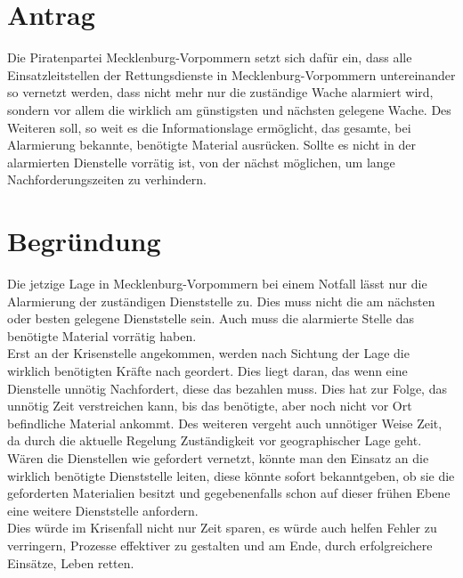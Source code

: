 \section{Antrag}

Die Piratenpartei Mecklenburg-Vorpommern setzt sich dafür ein, dass alle Einsatzleitstellen der Rettungsdienste in Mecklenburg-Vorpommern untereinander so vernetzt werden, dass nicht mehr nur die zuständige Wache alarmiert wird, sondern vor allem die wirklich am günstigsten und nächsten gelegene Wache. Des Weiteren soll, so weit es die Informationslage ermöglicht, das gesamte, bei Alarmierung bekannte, benötigte Material ausrücken. Sollte es nicht in der alarmierten Dienstelle vorrätig ist, von der nächst möglichen, um lange Nachforderungszeiten zu verhindern.

\section{Begründung}

Die jetzige Lage in Mecklenburg-Vorpommern bei einem Notfall lässt nur die Alarmierung der zuständigen Dienststelle zu. Dies muss nicht die am nächsten oder besten gelegene Dienststelle sein. Auch muss die alarmierte Stelle das benötigte Material vorrätig haben.\\Erst an der Krisenstelle angekommen, werden nach Sichtung der Lage die wirklich benötigten Kräfte nach geordert. Dies liegt daran, das wenn eine Dienstelle unnötig Nachfordert, diese das bezahlen muss. Dies hat zur Folge, das unnötig Zeit verstreichen kann, bis das benötigte, aber noch nicht vor Ort befindliche Material ankommt. Des weiteren vergeht auch unnötiger Weise Zeit, da durch die aktuelle Regelung Zuständigkeit vor geographischer Lage geht.\\Wären die Dienstellen wie gefordert vernetzt, könnte man den Einsatz an die wirklich benötigte Dienststelle leiten, diese könnte sofort bekanntgeben, ob sie die geforderten Materialien besitzt und gegebenenfalls schon auf dieser frühen Ebene eine weitere Dienststelle anfordern.\\Dies würde im Krisenfall nicht nur Zeit sparen, es würde auch helfen Fehler zu verringern, Prozesse effektiver zu gestalten und am Ende, durch erfolgreichere Einsätze, Leben retten.
